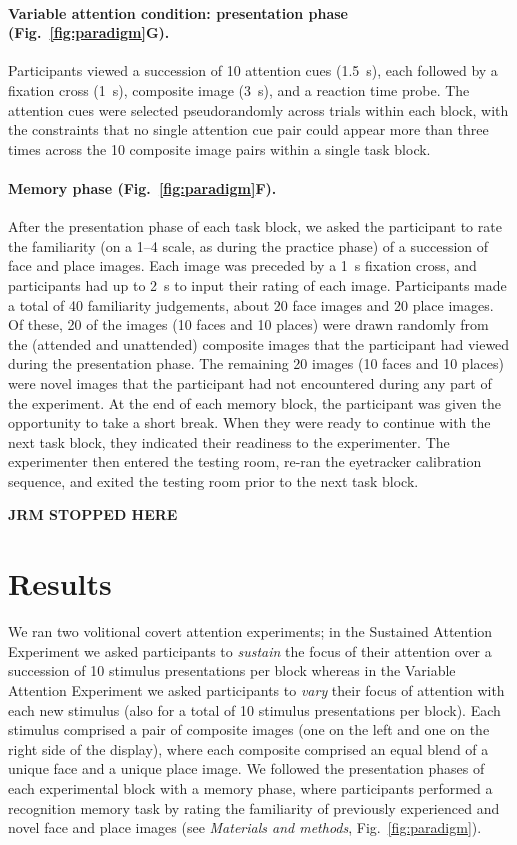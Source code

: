 \documentclass[english]{article}
\begin{document}
\paragraph*{Variable attention condition: presentation phase
(Fig.~\ref{fig:paradigm}G).}

Participants viewed a succession of 10 attention cues (1.5~s), each followed by
a fixation cross (1~s), composite image (3~s), and a reaction time probe. The
attention cues were selected pseudorandomly across trials within each block,
with the constraints that no single attention cue pair could appear more than
three times across the 10 composite image pairs within a single task block.

\paragraph*{Memory phase (Fig.~\ref{fig:paradigm}F).}

After the presentation phase of each task block, we asked the participant to
rate the familiarity (on a 1--4 scale, as during the practice phase) of a
succession of face and place images. Each image was preceded by a 1~s fixation
cross, and participants had up to 2~s to input their rating of each image.
Participants made a total of 40 familiarity judgements, about 20 face images
and 20 place images. Of these, 20 of the images (10 faces and 10 places) were
drawn randomly from the (attended and unattended) composite images that the
participant had viewed during the presentation phase. The remaining 20 images
(10 faces and 10 places) were novel images that the participant had not
encountered during any part of the experiment. At the end of each memory block,
the participant was given the opportunity to take a short break. When they were
ready to continue with the next task block, they indicated their readiness to
the experimenter. The experimenter then entered the testing room, re-ran the
eyetracker calibration sequence, and exited the testing room prior to the next
task block.

\textbf{JRM STOPPED HERE}

\section*{Results}

We ran two volitional covert attention experiments; in the Sustained Attention
Experiment we asked participants to \textit{sustain} the focus of their
attention over a succession of 10 stimulus presentations per block whereas in
the Variable Attention Experiment we asked participants to \textit{vary} their
focus of attention with each new stimulus (also for a total of 10 stimulus
presentations per block). Each stimulus comprised a pair of composite images
(one on the left and one on the right side of the display), where each
composite comprised an equal blend of a unique face and a unique place image.
We followed the presentation phases of each experimental block with a memory
phase, where participants performed a recognition memory task by rating the
familiarity of previously experienced and novel face and place images (see
\textit{Materials and methods}, Fig.~\ref{fig:paradigm}).
\end{document}
